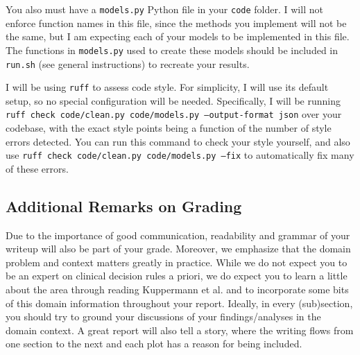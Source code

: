 \documentclass[10pt,letterpaper]{article}
\begin{document}
You also must have a \texttt{models.py} Python file in your \texttt{code} folder. I will not enforce function names in this file, since the methods you implement will not be the same, but I am expecting each of your models to be implemented in this file. The functions in \texttt{models.py} used to create these models should be included in \texttt{run.sh} (see general instructions) to recreate your results.

I will be using \texttt{ruff} to assess code style. For simplicity, I will use its default setup, so no special configuration will be needed. Specifically, I will be running \texttt{ruff check code/clean.py code/models.py --output-format json} over your codebase, with the exact style points being a function of the number of style errors detected. You can run this command to check your style yourself, and also use \texttt{ruff check code/clean.py code/models.py --fix} to automatically fix many of these errors.

\subsection*{Additional Remarks on Grading}

Due to the importance of good communication, readability and grammar of your writeup will also be part of your grade. Moreover, we emphasize that the domain problem and context matters greatly in practice. While we do not expect you to be an expert on clinical decision rules a priori, we do expect you to learn a little about the area through reading Kuppermann et al. and to incorporate some bits of this domain information throughout your report. Ideally, in every (sub)section, you should try to ground your discussions of your findings/analyses in the domain context. A great report will also tell a story, where the writing flows from one section to the next and each plot has a reason for being included.
\end{document}
